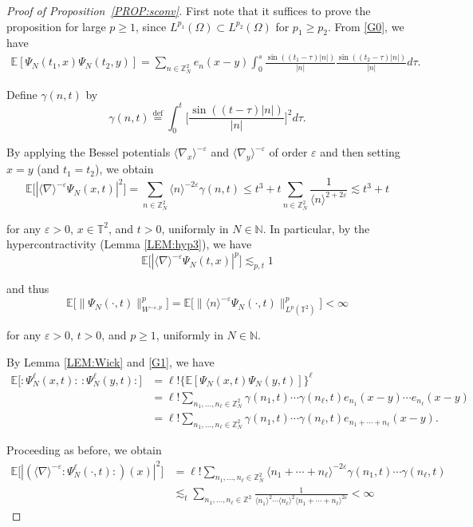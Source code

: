 \documentclass[letterpaper, 11pt,  reqno]{amsart}
\newcommand{\1}{\hspace{0.5mm}\text{I}\hspace{0.5mm}}
\newcommand{\noi}{\noindent}
\newcommand{\Z}{\mathbb{Z}}
\newcommand{\T}{\mathbb{T}}
\newcommand{\E}{\mathbb{E}}
\newcommand{\nb}{\nabla}
\newcommand{\eps}{\varepsilon}
\newcommand{\g}{\gamma}
\renewcommand{\l}{\ell}
\renewcommand{\O}{\Omega}
\newcommand{\les}{\lesssim}
\newcommand{\jb}[1]
{\langle #1 \rangle}
\numberwithin{equation}{section}
\numberwithin{theorem}{section}
\begin{document}
\begin{proof}[Proof of Proposition~\ref{PROP:sconv}]
First note that it suffices to prove the proposition for large $p \geq 1$,
since $L^{p_1}(\O) \subset L^{p_2}(\O)$ for $p_1 \geq p_2$.
From \eqref{G0},  we have 
\begin{align}
 \mathbb{E} [\Psi_N (t_1, x) \Psi_N(t_2, y)] = \sum_{n \in \mathbb{Z}^2_N} e_n (x-y)
  \int_0^s \frac{\sin ((t_1 - \tau ) | n |)}{| n |} \frac{\sin ((t_2 - \tau)
   | n |)}{| n |} d\tau .
\label{G1}
\end{align}


\noi
Define  $\g(n,t)$  by
\[
   \g(n,t) \stackrel{\text{def}}{=}\int_0^t \bigg[ \frac{\sin ((t - \tau) | n |)}{| n |} \bigg]^2 d\tau.
 \]

\noi
By applying the Bessel potentials $\jb{\nb_x}^{-\eps}$ 
and $\jb{\nb_y}^{-\eps}$  of order $\eps$
and then setting $x = y$ (and $t_1 = t_2$), 
we obtain
\[ \E \big[| \jb{\nb}^{-\eps} \Psi_N (x, t) |^2\big] 
= \sum_{n \in \Z^2_N} \jb{n}^{-2\eps} \g(n,t)
   \leq t^3  + t \sum_{n \in \Z^2_N}
   \frac{1}{\jb{n}^{2+2\eps}} \les t^3 + t \]


\noi
for any $\eps > 0$, $x \in \T^2$, and $t > 0$, 
uniformly in $N \in \mathbb{N}$.
In particular, by the hypercontractivity (Lemma \ref{LEM:hyp3}), we have
\[ \E\big[ | \jb{\nb}^{-\eps} \Psi_N (t, x) |^p\big] \les_{p, t} 1 \]

\noi
and thus
\[\E \big[\| \Psi_N (\cdot, t) \|_{W^{-\eps,p}}^p \big]
=  \E \big[\| \jb{n}^{-\eps} \Psi_N (\cdot, t) \|_{L^p (\T^2)}^p \big]
< \infty \]

\noi
for any $\eps > 0$, $t > 0$,  and $p \geq 1$, uniformly in $N\in \mathbb{N}$. 

By Lemma \ref{LEM:Wick} 
and \eqref{G1},  we have
\begin{align*}
 \E \big[:\! \Psi^{\l}_N (x, t) \!:\,  :\! \Psi^{\l}_N (y, t) \!:\big] 
 & = \l! \big\{\mathbb{E} [\Psi_N (x, t) \Psi_N (y, t)]\big\}^{\l} \\
  & =\l! \sum_{n_1, \ldots, n_{\ell} \in \mathbb{Z}^2_N} \gamma (n_1, t) \cdots
  \gamma (n_{\ell}, t) e_{n_1} (x - y) \cdots e_{n_{\ell}} (x - y) \\
  & = \l!\sum_{n_1, \ldots, n_{\ell} \in \mathbb{Z}^2_N} \gamma (n_1, t) \cdots
  \gamma (n_{\ell}, t) e_{n_1 + \cdots + n_{\ell}} (x - y) .
\end{align*} 



\noi
Proceeding as before, we obtain
\begin{align*}
\E\big[| (\jb{\nb}^{-\eps} :\! \Psi^{\l}_N (\cdot, t) \!:) (x) |^2 \big] 
& = \l! \sum_{n_1,
   \ldots, n_{\ell} \in \mathbb{Z}^2_N} \langle n_1 + \cdots + n_{\ell}\rangle^{-2\eps} 
   \gamma (n_1, t) \cdots \gamma (n_{\ell}, t) \\
& \les_t \sum_{n_1, \ldots, n_{\ell} \in \mathbb{Z}^2} \frac{1}{\langle n_1
   \rangle^2 \cdots \langle n_{\ell} \rangle^2 \langle n_1 + \cdots + n_{\ell}
   \rangle^{2\eps}} < \infty
\end{align*}



\end{proof}
\end{document}
